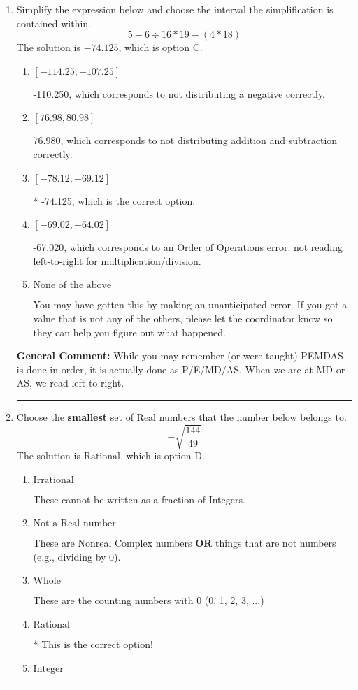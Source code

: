 \documentclass{extbook}[14pt]
\newcommand{\litem}[1]{\item #1

\rule{\textwidth}{0.4pt}}
\begin{document}
\begin{enumerate}\litem{
Simplify the expression below and choose the interval the simplification is contained within.
\[ 5 - 6 \div 16 * 19 - (4 * 18) \]The solution is \( -74.125 \), which is option C.\begin{enumerate}[label=\Alph*.]
\item \( [-114.25, -107.25] \)

 -110.250, which corresponds to not distributing a negative correctly.
\item \( [76.98, 80.98] \)

 76.980, which corresponds to not distributing addition and subtraction correctly.
\item \( [-78.12, -69.12] \)

* -74.125, which is the correct option.
\item \( [-69.02, -64.02] \)

 -67.020, which corresponds to an Order of Operations error: not reading left-to-right for multiplication/division.
\item \( \text{None of the above} \)

 You may have gotten this by making an unanticipated error. If you got a value that is not any of the others, please let the coordinator know so they can help you figure out what happened.
\end{enumerate}

\textbf{General Comment:} While you may remember (or were taught) PEMDAS is done in order, it is actually done as P/E/MD/AS. When we are at MD or AS, we read left to right.
}
\litem{
Choose the \textbf{smallest} set of Real numbers that the number below belongs to.
\[ -\sqrt{\frac{144}{49}} \]The solution is \( \text{Rational} \), which is option D.\begin{enumerate}[label=\Alph*.]
\item \( \text{Irrational} \)

These cannot be written as a fraction of Integers.
\item \( \text{Not a Real number} \)

These are Nonreal Complex numbers \textbf{OR} things that are not numbers (e.g., dividing by 0).
\item \( \text{Whole} \)

These are the counting numbers with 0 (0, 1, 2, 3, ...)
\item \( \text{Rational} \)

* This is the correct option!
\item \( \text{Integer} \)


\end{enumerate}}
\end{enumerate}
\end{document}
